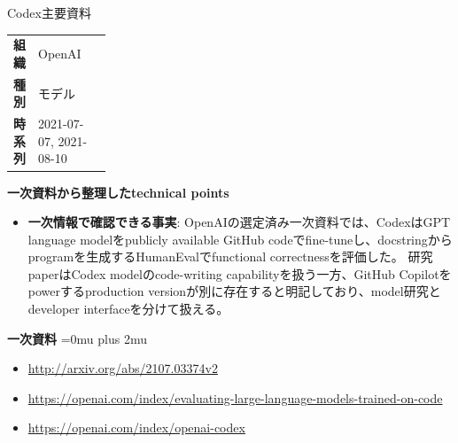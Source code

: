 \begin{technicalnote}{Codex}{主要資料}
\begingroup
\begin{tabularx}{\linewidth}{@{}>{\bfseries}p{0.22\linewidth}X@{}}
組織 & OpenAI \\
種別 & モデル \\
時系列 & 2021-07-07, 2021-08-10 \\
\end{tabularx}
\smallskip
\begin{minipage}{\linewidth}
{\bfseries 一次資料から整理したtechnical points}
\begin{itemize}[leftmargin=1.5em,itemsep=0.35em]
\item \textbf{一次情報で確認できる事実}: OpenAIの選定済み一次資料では、CodexはGPT language modelをpublicly available GitHub codeでfine-tuneし、docstringからprogramを生成するHumanEvalでfunctional correctnessを評価した。 研究paperはCodex modelのcode-writing capabilityを扱う一方、GitHub Copilotをpowerするproduction versionが別に存在すると明記しており、model研究とdeveloper interfaceを分けて扱える。
\end{itemize}
\begin{minipage}{\linewidth}
\begin{samepage}
{\bfseries 一次資料}
\begingroup\sloppy
\Urlmuskip=0mu plus 2mu\relax
\begin{itemize}[leftmargin=1.5em,itemsep=0.25em]
\item {\scriptsize\url{http://arxiv.org/abs/2107.03374v2}}
\item {\scriptsize\url{https://openai.com/index/evaluating-large-language-models-trained-on-code}}
\item {\scriptsize\url{https://openai.com/index/openai-codex}}
\end{itemize}
\endgroup
\end{samepage}
\end{minipage}
\end{minipage}
\endgroup
\end{technicalnote}
\medskip

